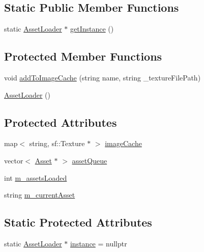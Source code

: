 \subsection*{Static Public Member Functions}
\begin{DoxyCompactItemize}
\item 
static \hyperlink{class_asset_loader}{Asset\+Loader} $\ast$ \hyperlink{class_asset_loader_a84f304e93bb704447080e2e722e6d413}{get\+Instance} ()
\end{DoxyCompactItemize}
\subsection*{Protected Member Functions}
\begin{DoxyCompactItemize}
\item 
void \hyperlink{class_asset_loader_a02a029329bac26f078cc8a8248b484ad}{add\+To\+Image\+Cache} (string name, string \+\_\+texture\+File\+Path)
\item 
\hyperlink{class_asset_loader_ae090ac88a0e6df2c7cc560da9f4c4f25}{Asset\+Loader} ()
\end{DoxyCompactItemize}
\subsection*{Protected Attributes}
\begin{DoxyCompactItemize}
\item 
map$<$ string, sf\+::\+Texture $\ast$ $>$ \hyperlink{class_asset_loader_a1420f613835a3aa5ca97affb12b31da8}{image\+Cache}
\item 
vector$<$ \hyperlink{struct_asset}{Asset} $\ast$ $>$ \hyperlink{class_asset_loader_a9b8deb026e3b796b37c99cb1253d7868}{asset\+Queue}
\item 
int \hyperlink{class_asset_loader_a46d605269740622e52033a2d15f1041a}{m\+\_\+assets\+Loaded}
\item 
string \hyperlink{class_asset_loader_ad7816a644b0358ff24f308beb6c27b1e}{m\+\_\+current\+Asset}
\end{DoxyCompactItemize}
\subsection*{Static Protected Attributes}
\begin{DoxyCompactItemize}
\item 
static \hyperlink{class_asset_loader}{Asset\+Loader} $\ast$ \hyperlink{class_asset_loader_a8109777021214db1df6aace310c9f842}{instance} = nullptr
\end{DoxyCompactItemize}


